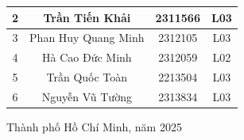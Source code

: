 \documentclass[a4paper]{article}
\begin{document}
\begin{titlepage}
\begin{center}
\begin{tabular}{|c|c|c|c|}
\hline 
{2} & {Trần Tiến Khải} & {2311566} & {L03}\\

\hline
{3} & {Phan Huy Quang Minh} & {2312105} & {L03} \\

\hline
{4} & {Hà Cao Đức Minh} & {2312059} & {L02} \\

\hline
{5} & {Trần Quốc Toàn} & {2213504} & {L03} \\

\hline
{6} & {Nguyễn Vũ Tường} & {2313834} & {L03} \\
\hline

\end{tabular}

\vfill
Thành phố Hồ Chí Minh, năm 2025

\end{center}
\end{titlepage}

\pagebreak
\tableofcontents
\pagebreak









 







% 

% 
% 
\end{document}
